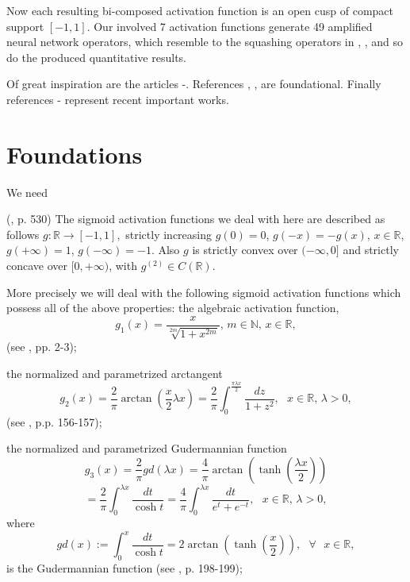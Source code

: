 \documentclass[10pt]{NSP1}
\numberwithin{equation}{section}
\begin{document}
Now each resulting bi-composed activation function is an open cusp of
compact support $\left[ -1,1\right] $. Our involved 7 activation functions
generate 49 amplified neural network operators, which resemble to the
squashing operators in \cite{2}, \cite{4}, and so do the produced
quantitative results.

Of great inspiration are the articles \cite{12}-\cite{14}. References \cite
{15}, \cite{16}, \cite{18} are foundational. Finally references \cite{19}-
\cite{28} represent recent important works.

\section{\; Foundations}

We need

\begin{definition}
\label{d1}(\cite{7}, p. 530) The sigmoid activation functions we deal with
here are described as follows $g:\mathbb{R}\rightarrow \left[ -1,1\right] ,$
strictly increasing $g\left( 0\right) =0$, $g\left( -x\right) =-g\left(
x\right) $, $x\in \mathbb{R}$, $g\left( +\infty \right) =1$, $g\left(
-\infty \right) =-1$. Also $g$ is strictly convex over $(-\infty ,0]$ and
strictly concave over $[0,+\infty )$, with $g^{\left( 2\right) }\in C\left(
\mathbb{R}\right) $.
\end{definition}

More precisely we will deal with the following sigmoid activation functions
which possess all of the above properties: the algebraic activation
function,
\begin{equation}
g_{1}\left( x\right) =\frac{x}{\sqrt[2m]{1+x^{2m}}}\text{, \ }m\in \mathbb{N}
\text{, }x\in \mathbb{R},  \tag{1}  \label{1.}
\end{equation}
(see \cite{6}, pp. 2-3);

the normalized and parametrized arctangent
\begin{equation}
g_{2}\left( x\right) =\frac{2}{\pi }\arctan \left( \frac{x}{2}\lambda
x\right) =\frac{2}{\pi }\int_{0}^{\frac{\pi \lambda x}{2}}\frac{dz}{1+z^{2}},
\text{ \ }x\in \mathbb{R}\text{, }\lambda >0,  \tag{2}  \label{2.}
\end{equation}
(see \cite{7}, p.p. 156-157);

the normalized and parametrized Gudermannian function
\begin{equation*}
g_{3}\left( x\right) =\frac{2}{\pi }gd\left( \lambda x\right) =\frac{4}{\pi }
\arctan \left( \tanh \left( \frac{\lambda x}{2}\right) \right)
\end{equation*}
\begin{equation}
=\frac{2}{\pi }\int_{0}^{\lambda x}\frac{dt}{\cosh t}=\frac{4}{\pi }
\int_{0}^{\lambda x}\frac{dt}{e^{t}+e^{-t}},\text{ \ }x\in \mathbb{R}
\text{, }\lambda >0,  \tag{3}  \label{3.}
\end{equation}
where
\begin{equation*}
gd\left( x\right) :=\int_{0}^{x}\frac{dt}{\cosh t}=2\arctan \left( \tanh
\left( \frac{x}{2}\right) \right) ,\text{ \ }\forall \text{ }x\in \mathbb{R},
\end{equation*}
is the Gudermannian function (see \cite{7}, p. 198-199);
\end{document}
